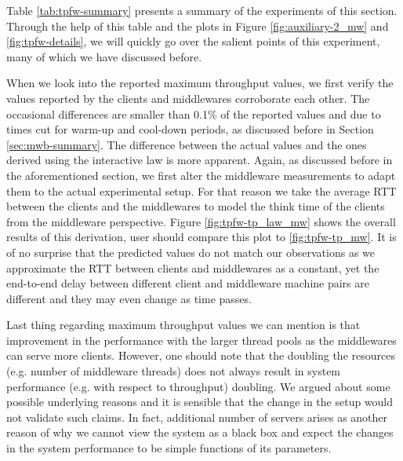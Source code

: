 \documentclass[11pt,a4paper]{article}
\begin{document}
Table \ref{tab:tpfw-summary} presents a summary of the experiments of this section. Through the help of this table and the plots in Figure \ref{fig:auxiliary-2_mw} and \ref{fig:tpfw-details}, we will quickly go over the salient points of this experiment, many of which we have discussed before.
\par When we look into the reported maximum throughput values, we first verify the values reported by the clients and middlewares corroborate each other. The occasional differences are smaller than 0.1\% of the reported values and due to times cut for warm-up and cool-down periods, as discussed before in Section \ref{sec:mwb-summary}. The difference between the actual values and the ones derived using the interactive law is more apparent. Again, as discussed before in the aforementioned section, we first alter the middleware measurements to adapt them to the actual experimental setup. For that reason we take the average RTT between the clients and the middlewares to model the think time of the clients from the middleware perspective. Figure \ref{fig:tpfw-tp_law_mw} shows the overall results of this derivation, user should compare this plot to \ref{fig:tpfw-tp_mw}. It is of no surprise that the predicted values do not match our observations as we approximate the RTT between clients and middlewares as a constant, yet the end-to-end delay between different client and middleware machine pairs are different and they may even change as time passes.
\par Last thing regarding maximum throughput values we can mention is that improvement in the performance with the larger thread pools as the middlewares can serve more clients. However, one should note that the doubling the resources (e.g. number of middleware threads) does not always result in system performance (e.g. with respect to throughput) doubling. We argued about some possible underlying reasons and it is sensible that the change in the setup would not validate such claims. In fact, additional number of servers arises as another reason of why we cannot view the system as a black box and expect the changes in the system performance to be simple functions of its parameters.
\end{document}
